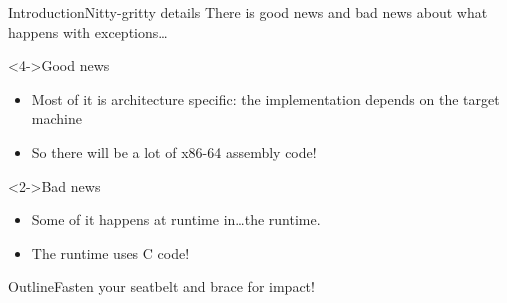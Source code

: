 \begin{frame}{Introduction}{Nitty-gritty details}
  There is good news and bad news about what happens with exceptions\ldots
  \begin{exampleblock}<4->{Good news}
    \setlength{\textwidth}{0.6\textwidth}
    \begin{itemize}
      \item<4-> Most of it is architecture specific: the implementation depends on the target machine
      \item<5-> So there will be a lot of x86-64 assembly code!
    \end{itemize}
  \end{exampleblock}
  \begin{alertblock}<2->{Bad news}
    \begin{itemize}
      \item<2-> Some of it happens at runtime in\dots the runtime.
      \item<3-> The runtime uses C code!
    \end{itemize}
  \end{alertblock}
\end{frame}


\begin{frame}{Outline}{Fasten your seatbelt and brace for impact!}
  \tableofcontents
\end{frame}
